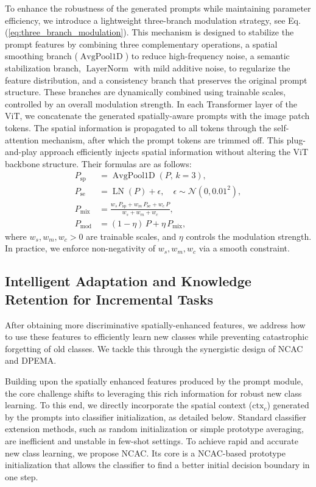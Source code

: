﻿\documentclass[letterpaper,journal]{IEEEtran}
\begin{document}
To enhance the robustness of the generated prompts while maintaining parameter efficiency, we introduce a lightweight three-branch modulation strategy, see Eq. (\ref{eq:three_branch_modulation}). This mechanism is designed to stabilize the prompt features by combining three complementary operations, a spatial smoothing branch ($\operatorname{AvgPool1D}$) to reduce high-frequency noise, a semantic stabilization branch, $\operatorname{LayerNorm}$ with mild additive noise, to regularize the feature distribution, and a consistency branch that preserves the original prompt structure. These branches are dynamically combined using trainable scales, controlled by an overall modulation strength. In each Transformer layer of the ViT, we concatenate the generated spatially-aware prompts with the image patch tokens. The spatial information is propagated to all tokens through the self-attention mechanism, after which the prompt tokens are trimmed off. This plug-and-play approach efficiently injects spatial information without altering the ViT backbone structure. Their formulas are as follows:
\begin{align}
\label{eq:three_branch_modulation}
P_{\mathrm{sp}} &= \operatorname{AvgPool1D}(P,\,k{=}3),\\
P_{\mathrm{se}} &= \operatorname{LN}(P) + \epsilon,\quad \epsilon\sim\mathcal{N}(0, 0.01^2),\\
P_{\mathrm{mix}} &= \frac{w_s\,P_{\mathrm{sp}} + w_m\,P_{\mathrm{se}} + w_c\,P}{w_s + w_m + w_c},\\
P_{\mathrm{mod}} &= (1-\eta)\,P + \eta\,P_{\mathrm{mix}},
\end{align} where $w_s, w_m, w_c > 0$ are trainable scales, and $\eta$ controls the modulation strength. In practice, we enforce non-negativity of $w_s,w_m,w_c$ via a smooth constraint.
\subsection{Intelligent Adaptation and Knowledge Retention for Incremental Tasks}
After obtaining more discriminative spatially-enhanced features, we address how to use these features to efficiently learn new classes while preventing catastrophic forgetting of old classes. We tackle this through the synergistic design of NCAC and DPEMA.

Building upon the spatially enhanced features produced by the prompt module, the core challenge shifts to leveraging this rich information for robust new class learning. To this end, we directly incorporate the spatial context ($\mathrm{ctx}_c$) generated by the prompts into classifier initialization, as detailed below.
Standard classifier extension methods, such as random initialization or simple prototype averaging, are inefficient and unstable in few-shot settings. To achieve rapid and accurate new class learning, we propose NCAC. Its core is a NCAC-based prototype initialization that allows the classifier to find a better initial decision boundary in one step.
\end{document}
